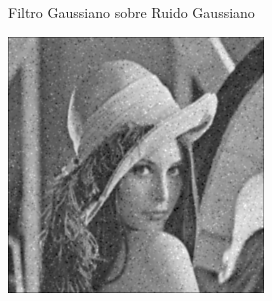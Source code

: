 \documentclass{beamer}
\begin{document}
\begin{frame}[fragile]{Filtro Gaussiano sobre Ruido Gaussiano}
\begin{minipage}{0.25\linewidth}
	\end{minipage}\hfill
	\begin{minipage}{0.25\linewidth}
		\centering
		\includegraphics[width=\linewidth]{../results/lena_gauss_sigma50_gaussiano}
	\end{minipage}
\end{frame}
\end{document}
